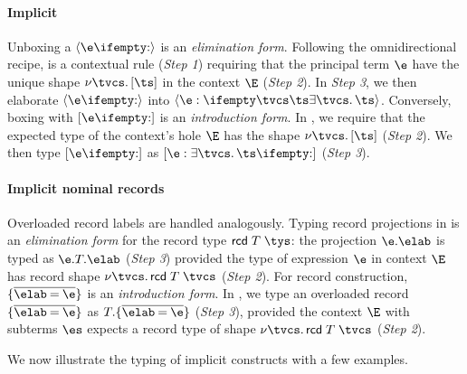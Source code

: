 \documentclass[acmsmall,screen,nonacm%
\Anonymous{,anonymous}{}%
\Final{}{,review}%
]{acmart}
\begin{document}
\paragraph{Implicit \polytypes}

Unboxing a \polytype $\einst \e$ is an \emph{elimination form}. Following the
omnidirectional recipe,  is a contextual rule (\emph{Step 1})
requiring that the principal term $\e$ have the unique shape $\any \tvcs \tpoly
\ts$ in the context $\E$ (\emph{Step 2}). In \emph{Step 3}, we then elaborate
$\einst \e$ into $\exinst \e \tvcs \ts$.
%
Conversely, boxing with $\epoly \e$ is an \emph{introduction form}. In
, we require that the expected type of the context's hole $\E$ has
the shape $\any \tvcs \tpoly \ts$ (\emph{Step 2}). We then type $\epoly \e$ as
$\expoly \e \tvcs \ts$ (\emph{Step 3}).


\paragraph{Implicit nominal records}

Overloaded record labels are handled analogously.
%
Typing record projections in  is an \emph{elimination
  form} for the record type $\trcd \T \tys$: the projection $\efield \e \elab$
is typed as $\exfield \e \T \elab$ (\emph{Step 3}) provided the
type of expression $\e$ in context $\E$ has record shape
$\any \tvcs \trcd \T \tvcs$ (\emph{Step 2}).
%
For record construction, $\erecord {\overline{\elab = \e}}$ is an
\emph{introduction form}. In , we type an overloaded record
$\erecord {\overline{\elab = \e}}$ as $\exrecord \T {\overline{\elab = \e}}$
(\emph{Step 3}), provided the context $\E$ with subterms $\es$ expects a
record type of shape $\any \tvcs \trcd \T \tvcs$ (\emph{Step 2}).

We now illustrate the typing of implicit constructs with a few examples.
\end{document}
